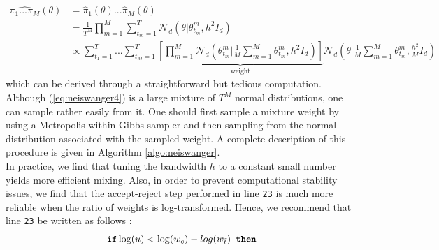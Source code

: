 \documentclass[11pt,a4paper]{report}\usepackage[]{graphicx}\usepackage[]{color}
\begin{document}
\begin{align}
    \label{eq:neiswanger4}
    \widehat{\pi_1...\pi_M}(\theta)&=\hat\pi_1(\theta)...\hat\pi_M(\theta)\nonumber\\
    &=\frac{1}{T^M}\prod_{m=1}^M\sum_{t_m=1}^T \mathcal{N}_d(\theta|\theta_{t_m}^m,h^2 I_d)\nonumber\\
    &\propto\sum_{t_1=1}^T...\sum_{t_M=1}^T\underbrace{\left[\prod_{m=1}^M\mathcal N_d\left(\theta_{t_m}^m\bigg|\frac1M\sum_{m=1}^M\theta_{t_m}^m,h^2I_d\right)\right]}_\text{weight}
    \mathcal N_d\left(\theta\bigg|\frac1M\sum_{m=1}^M\theta_{t_m}^m,\frac{h^2}{M}I_d\right)
\end{align}
which can be derived through a straightforward but tedious computation.\\
Although (\ref{eq:neiswanger4}) is a large mixture of $T^M$ normal distributions, one can  sample rather easily from it. One should first sample a mixture weight by using a Metropolis within Gibbs sampler and then sampling from the normal distribution associated with the sampled weight. A complete description of this procedure is given in Algorithm \ref{algo:neiswanger}.\\
In practice, we find that tuning the bandwidth $h$ to a constant small number yields more efficient mixing. Also, in order to prevent computational stability issues, we find that the accept-reject step performed in line \texttt{23} is much more reliable when the ratio of weights is log-transformed. Hence, we recommend that line \texttt{23} be written as follows : 
$$\textbf{\texttt{if}} \log(u)<\log(w_c)-log(w_{\tilde{t}}) \textbf{\texttt{ then}}$$
\end{document}
